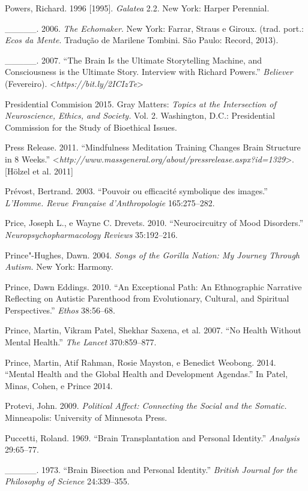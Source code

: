{\begin{Parskip}
Powers, Richard. 1996 {[}1995{]}. \emph{Galatea} 2.2. New York: Harper
Perennial.

\_\_\_\_\_. 2006. \emph{The Echomaker}. New York: Farrar, Straus e
Giroux. (trad. port.: \emph{Ecos da Mente}. Tradução de Marilene
Tombini. São Paulo: Record, 2013).

\_\_\_\_\_. 2007. ``The Brain Is the Ultimate Storytelling Machine, and
Consciousness is the Ultimate Story. Interview with Richard Powers.''
\emph{Believer} (Fevereiro).
\textless{}\emph{https://bit.ly/2ICIzTe}\textgreater{}

Presidential Commision 2015. Gray Matters: \emph{Topics at the
Intersection of Neuroscience, Ethics, and Society.} Vol. 2. Washington,
D.C.: Presidential Commission for the Study of Bioethical Issues.

Press Release. 2011. ``Mindfulness Meditation Training Changes Brain
Structure in 8 Weeks.''
\textless{}\emph{http://www.massgeneral.org/about/pressrelease.aspx?id​=1329}\textgreater{}.
{[}Hölzel et al. 2011{]}

Prévost, Bertrand. 2003. ``Pouvoir ou efficacité symbolique des
images.'' \emph{L'Homme. Revue Française d'Anthropologie} 165:275--282.

Price, Joseph L., e Wayne C. Drevets. 2010. ``Neurocircuitry of Mood
Disorders.'' \emph{Neuropsychopharmacology Reviews} 35:192--216.

Prince"-Hughes, Dawn. 2004. \emph{Songs of the Gorilla Nation: My Journey
Through Autism.} New York: Harmony.

Prince, Dawn Eddings. 2010. ``An Exceptional Path: An Ethnographic
Narrative Reflecting on Autistic Parenthood from Evolutionary, Cultural,
and Spiritual Perspectives.'' \emph{Ethos} 38:56--68.

Prince, Martin, Vikram Patel, Shekhar Saxena, et al. 2007. ``No Health
Without Mental Health.'' \emph{The Lancet} 370:859--877.

Prince, Martin, Atif Rahman, Rosie Mayston, e Benedict Weobong. 2014.
``Mental Health and the Global Health and Development Agendas.'' In
Patel, Minas, Cohen, e Prince 2014.

Protevi, John. 2009. \emph{Political Affect: Connecting the Social and
the Somatic.} Minneapolis: University of Minnesota Press.

Puccetti, Roland. 1969. ``Brain Transplantation and Personal Identity.''
\emph{Analysis} 29:65--77.

\_\_\_\_\_. 1973. ``Brain Bisection and Personal Identity.''
\emph{British Journal for the Philosophy of Science} 24:339--355.


\end{Parskip}}
